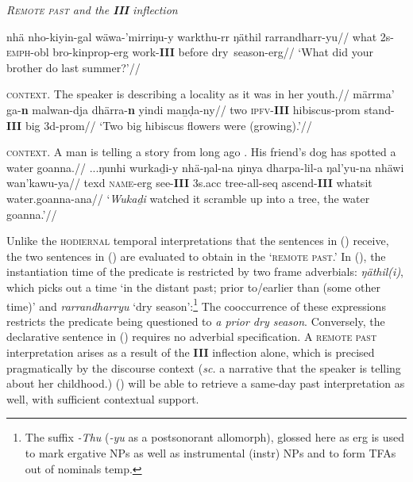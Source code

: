 \pex\textit{\textsc{Remote past} and the \textbf{III} inflection}

\a{}\begingl\gla nhä nho-kiyin-gal wäwa-'mirriŋu-y warkthu-rr ŋäthil rarrandharr-yu//
\glb what 2s-\textsc{emph}-\gls{obl} bro-\gls{kinprop}-\gls{erg} work-\textbf{III} before dry~season-\gls{erg}//
\glft`What did your brother do last summer?'//\endgl

\a{}\begingl\glpreamble\textsc{context.} The speaker is describing a locality as it was in her youth.//
\gla märrma' ga-\textbf{n} malwan-dja dhärra-\textbf{n} yindi maṉḍa-ny//
\glb two \textsc{ipfv}-\textbf{III} hibiscus-\gls{prom} stand-\textbf{III} big 3d-\gls{prom}//
\glft`Two big hibiscus flowers were (growing).'//\endgl

\a{}\begingl\glpreamble\textsc{context.} A man is telling a story from long ago . His friend's dog has spotted a water goanna.//
\gla ...ŋunhi wurkaḏi-y nhä-ŋal-{na} ŋinya dharpa-lil-a ŋal'yu-na nhäwi wan'kawu-ya//
\glb \gls{texd} \textsc{name}-\gls{erg} see-\textbf{III} 3s.\gls{acc} tree-\gls{all}-\gls{seq} ascend-\textbf{III} whatsit water.goanna-\gls{ana}//
\glft`\textit{Wukaḏi} watched it scramble up into a tree, the water goanna.'//\endgl



\xe


Unlike the \textsc{hodiernal} temporal interpretations that the sentences in (\blastx) receive, the two sentences in (\lastx) are evaluated to obtain in the `\textsc{remote past}.' In (), the instantiation time of the predicate is restricted by two frame adverbials: \textit{ŋäthil(i)}, which picks out a time `in the distant past; prior to/earlier than (some other time)' \citep[158]{Wilkinson1991} and \textit{rarrandharryu} `dry season':\footnote{The suffix \textit{-Thu} (\textit{-yu} as a postsonorant allomorph), glossed here as \gls{erg} is used to mark ergative NPs as well as instrumental (\gls{instr}) NPs and to form TFAs out of nominals \gls{temp}.} The cooccurrence of these expressions restricts the predicate being questioned to \textit{a prior dry season}. Conversely, the declarative sentence in () requires no adverbial specification. A \textsc{remote past} interpretation arises as a result of the \textbf{III} inflection alone, which is precised pragmatically by the discourse context (\textit{sc.} a narrative that the speaker is telling about her childhood.) () will be able to retrieve a same-day past interpretation as well, with sufficient contextual support.

